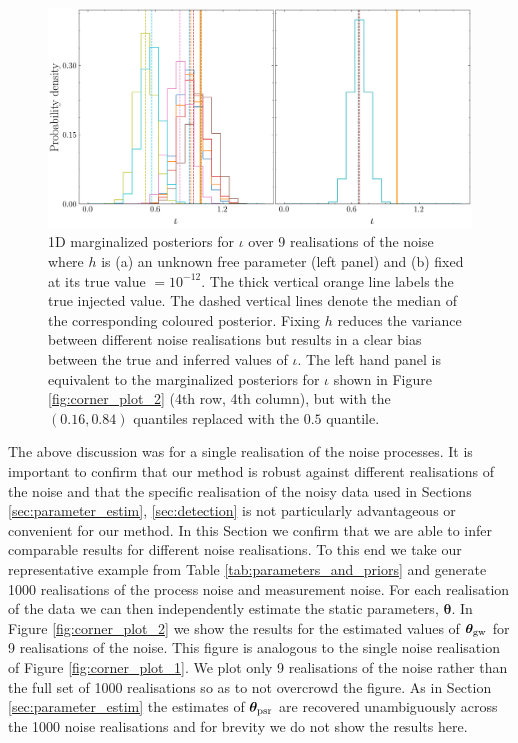 \documentclass[fleqn,usenatbib,useAMS]{mnras}
\begin{document}
\begin{figure}
	\centering
	\includegraphics[width=\textwidth]{images/compare_iotas_lines2}
	\caption{1D marginalized posteriors for $\iota$ over 9 realisations of the noise where $h$ is (a) an unknown free parameter (left panel) and (b) fixed at its true value $= 10^{-12}$. The thick vertical orange line labels the true injected value. The dashed vertical lines denote the median of the corresponding coloured posterior. Fixing $h$ reduces the variance between different noise realisations but results in a clear bias between the true and inferred values of $\iota$. The left hand panel is equivalent to the marginalized posteriors for $\iota$ shown in Figure \ref{fig:corner_plot_2} (4th row, 4th column), but with the $(0.16,0.84)$ quantiles replaced with the $0.5$ quantile.}
	\label{fig:iota}
\end{figure}


The above discussion was for a single realisation of the noise processes. It is important to confirm that our method is robust against different realisations of the noise and that the specific realisation of the noisy data used in Sections \ref{sec:parameter_estim}, \ref{sec:detection} is not particularly advantageous or convenient for our method. In this Section we confirm that we are able to infer comparable results for different noise realisations. To this end we take our representative example from Table \ref{tab:parameters_and_priors} and generate 1000 realisations of the process noise and measurement noise. For each realisation of the data we can then independently estimate the static parameters, $\boldsymbol{\theta}$. In Figure \ref{fig:corner_plot_2} we show the results for the  estimated values of $\boldsymbol{\theta}_{\rm gw}$ for 9 realisations of the noise. This figure is analogous to the single noise realisation of Figure \ref{fig:corner_plot_1}. We plot only 9 realisations of the noise rather than the full set of 1000 realisations so as to not overcrowd the figure. As in Section \ref{sec:parameter_estim} the estimates of $\boldsymbol{\theta}_{\rm psr}$ are recovered unambiguously across the 1000 noise realisations and for brevity we do not show the results here. \newline 
\end{document}
